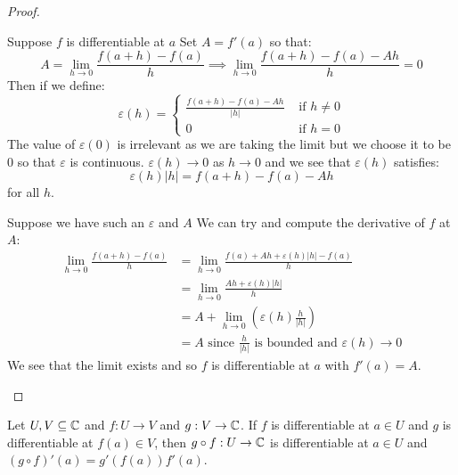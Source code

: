 \documentclass[../main.tex]{subfiles}
\begin{document}
\begin{proof}
  \begin{proofdirection}{Suppose $f$ is differentiable at $a$}
    Set $A = f'(a)$ so that:
    \[
      A = \lim_{h \to 0} \frac{f(a + h) - f(a)}{h} \implies \lim_{h \to 0} \frac{f(a + h) - f(a) - Ah}{h} = 0
    \]
    Then if we define:
    \[
      \varepsilon(h) = \begin{cases}
      \frac{f(a + h) - f(a) - Ah}{|h|} & \text{ if }h\neq0 \\
      0 & \text{ if } h = 0
      \end{cases}
    \]
    The value of $\varepsilon(0)$ is irrelevant as we are taking the limit but we choose it to be $0$ so that $\varepsilon$ is continuous.
    $\varepsilon(h) \to 0$ as $h \to 0$ and we see that $\varepsilon(h)$ satisfies:
    \[
      \varepsilon(h)|h| = f(a + h) - f(a) - Ah
    \]
    for all $h$.
  \end{proofdirection}
  \begin{proofdirection}{Suppose we have such an $\varepsilon$ and $A$}
    We can try and compute the derivative of $f$ at $A$:
    \begin{align*}
      \lim_{h \to 0} \frac{f(a + h) - f(a)}{h} &= \lim_{h \to 0} \frac{f(a) + Ah + \varepsilon(h)|h| - f(a)}{h} \\
                                               &= \lim_{h \to 0} \frac{Ah + \varepsilon(h)|h|}{h} \\
                                               &= A + \lim_{h \to 0} \left(\varepsilon(h) \frac{h}{|h|}\right) \\
                                               &= A \text{ since $\frac{h}{|h|}$ is bounded and $\varepsilon(h) \to 0$}
    \end{align*}
    We see that the limit exists and so $f$ is differentiable at $a$ with $f'(a) = A$.
  \end{proofdirection}
\end{proof}
\begin{proposition}
  Let $U, V \subseteq \mathbb{C}$ and $f: U \to V$ and $g: V \to \mathbb{C}$.
  If $f$ is differentiable at $a \in U$ and $g$ is differentiable at $f(a) \in V$, then $g \circ f: U \to \mathbb{C}$ is differentiable at $a \in U$ and $(g \circ f)'(a) = g'(f(a))f'(a)$. \label{chainRule}
\end{proposition}
\end{document}
